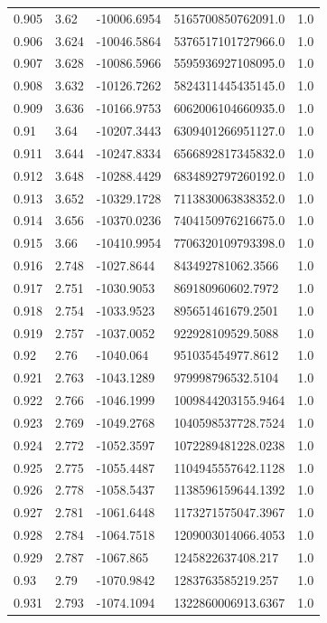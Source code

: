 \begin{tabular}{lllll}
0.905 & 3.62 & -10006.6954 & 5165700850762091.0 & 1.0 \\
0.906 & 3.624 & -10046.5864 & 5376517101727966.0 & 1.0 \\
0.907 & 3.628 & -10086.5966 & 5595936927108095.0 & 1.0 \\
0.908 & 3.632 & -10126.7262 & 5824311445435145.0 & 1.0 \\
0.909 & 3.636 & -10166.9753 & 6062006104660935.0 & 1.0 \\
0.91 & 3.64 & -10207.3443 & 6309401266951127.0 & 1.0 \\
0.911 & 3.644 & -10247.8334 & 6566892817345832.0 & 1.0 \\
0.912 & 3.648 & -10288.4429 & 6834892797260192.0 & 1.0 \\
0.913 & 3.652 & -10329.1728 & 7113830063838352.0 & 1.0 \\
0.914 & 3.656 & -10370.0236 & 7404150976216675.0 & 1.0 \\
0.915 & 3.66 & -10410.9954 & 7706320109793398.0 & 1.0 \\
0.916 & 2.748 & -1027.8644 & 843492781062.3566 & 1.0 \\
0.917 & 2.751 & -1030.9053 & 869180960602.7972 & 1.0 \\
0.918 & 2.754 & -1033.9523 & 895651461679.2501 & 1.0 \\
0.919 & 2.757 & -1037.0052 & 922928109529.5088 & 1.0 \\
0.92 & 2.76 & -1040.064 & 951035454977.8612 & 1.0 \\
0.921 & 2.763 & -1043.1289 & 979998796532.5104 & 1.0 \\
0.922 & 2.766 & -1046.1999 & 1009844203155.9464 & 1.0 \\
0.923 & 2.769 & -1049.2768 & 1040598537728.7524 & 1.0 \\
0.924 & 2.772 & -1052.3597 & 1072289481228.0238 & 1.0 \\
0.925 & 2.775 & -1055.4487 & 1104945557642.1128 & 1.0 \\
0.926 & 2.778 & -1058.5437 & 1138596159644.1392 & 1.0 \\
0.927 & 2.781 & -1061.6448 & 1173271575047.3967 & 1.0 \\
0.928 & 2.784 & -1064.7518 & 1209003014066.4053 & 1.0 \\
0.929 & 2.787 & -1067.865 & 1245822637408.217 & 1.0 \\
0.93 & 2.79 & -1070.9842 & 1283763585219.257 & 1.0 \\
0.931 & 2.793 & -1074.1094 & 1322860006913.6367 & 1.0 \\

\end{tabular}
